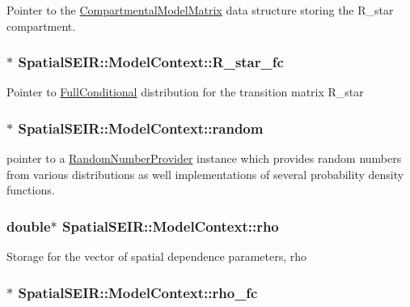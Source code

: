 Pointer to the \hyperlink{classSpatialSEIR_1_1CompartmentalModelMatrix}{Compartmental\-Model\-Matrix} data structure storing the R\-\_\-star compartment. \hypertarget{classSpatialSEIR_1_1ModelContext_a0f77d6658696a3c2fa584caa036135a5}{
\subsubsection[{R\-\_\-star\-\_\-fc}]{$\ast$ Spatial\-S\-E\-I\-R\-::\-Model\-Context\-::\-R\-\_\-star\-\_\-fc}}\label{classSpatialSEIR_1_1ModelContext_a0f77d6658696a3c2fa584caa036135a5}
Pointer to \hyperlink{classSpatialSEIR_1_1FullConditional}{Full\-Conditional} distribution for the transition matrix R\-\_\-star \hypertarget{classSpatialSEIR_1_1ModelContext_a752872a2e8bb09bbf8b2c400860f5c33}{
\subsubsection[{random}]{$\ast$ Spatial\-S\-E\-I\-R\-::\-Model\-Context\-::random}}\label{classSpatialSEIR_1_1ModelContext_a752872a2e8bb09bbf8b2c400860f5c33}
pointer to a \hyperlink{classSpatialSEIR_1_1RandomNumberProvider}{Random\-Number\-Provider} instance which provides random numbers from various distributions as well implementations of several probability density functions. \hypertarget{classSpatialSEIR_1_1ModelContext_a633cc9f969abeeb3ad9d3147023af13f}{
\subsubsection[{rho}]{\setlength{\rightskip}{0pt plus 5cm}double$\ast$ Spatial\-S\-E\-I\-R\-::\-Model\-Context\-::rho}}\label{classSpatialSEIR_1_1ModelContext_a633cc9f969abeeb3ad9d3147023af13f}
Storage for the vector of spatial dependence parameters, rho \hypertarget{classSpatialSEIR_1_1ModelContext_a894f23aa95ff98664b2cf71443cde6e5}{
\subsubsection[{rho\-\_\-fc}]{$\ast$ Spatial\-S\-E\-I\-R\-::\-Model\-Context\-::rho\-\_\-fc}}\label{classSpatialSEIR_1_1ModelContext_a894f23aa95ff98664b2cf71443cde6e5}

